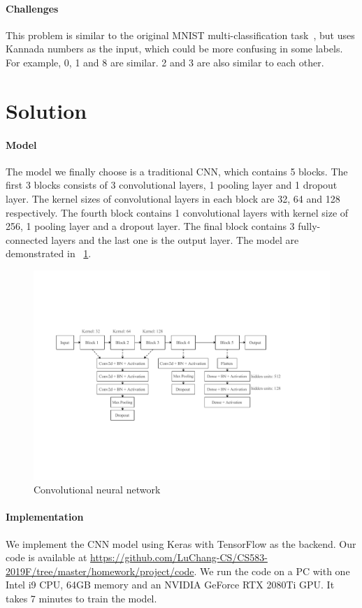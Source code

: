 \documentclass[]{article}
\begin{document}
\paragraph{Challenges}
This problem is similar to the original MNIST multi-classification task~\cite{lecun:mnist}, but uses Kannada numbers as the input, which could be more confusing in some labels. For example, 0, 1 and 8 are similar. 2 and 3 are also similar to each other.

\section{Solution}
\paragraph{Model}
The model we finally choose is a traditional CNN, which contains 5 blocks. The first 3 blocks consists of 3 convolutional layers, 1 pooling layer and 1 dropout layer. The kernel sizes of convolutional layers in each block are 32, 64 and 128 respectively. The fourth block contains 1 convolutional layers with kernel size of 256, 1 pooling layer and a dropout layer. The final block contains 3 fully-connected layers and the last one is the output layer. The model are demonstrated in \figurename{~\ref{fig:modelcnn}}.
\begin{figure}[H]
    \centering
    \includegraphics[width=14.5cm]{figs/model}
    \caption{Convolutional neural network}
    \label{fig:modelcnn}
\end{figure}

\paragraph{Implementation}
We implement the CNN model using Keras with TensorFlow as the backend. Our code is available at \url{https://github.com/LuChang-CS/CS583-2019F/tree/master/homework/project/code}. We run the code on a PC with one Intel i9 CPU, 64GB memory and an NVIDIA GeForce RTX 2080Ti GPU. It takes 7 minutes to train the model.
\end{document}
